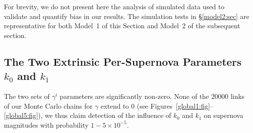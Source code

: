 \documentclass{aastex61}   	%
\begin{document}
\color{orange}
For brevity, we do not present here the analysis of simulated data used to validate and quantify bias in our results.
The simulation tests in \S\ref{model2:sec} are representative for both Model~1 of this Section and Model~2 of the subsequent section.
\color{black}

\subsection{The Two Extrinsic Per-Supernova Parameters $k_0$ and $k_1$}
The two sets of  $\gamma^i$ parameters  are significantly non-zero. 
None of the 20000 links of 
our Monte Carlo chains for $\gamma$ extend to 0 (see Figures~\ref{global1:fig}--\ref{global5:fig}), we thus claim detection of the
influence of $k_0$ and $k_1$  on supernova magnitudes
with probability $1-5\times 10^{-5}$.
%
%
%
%
%
\end{document}
